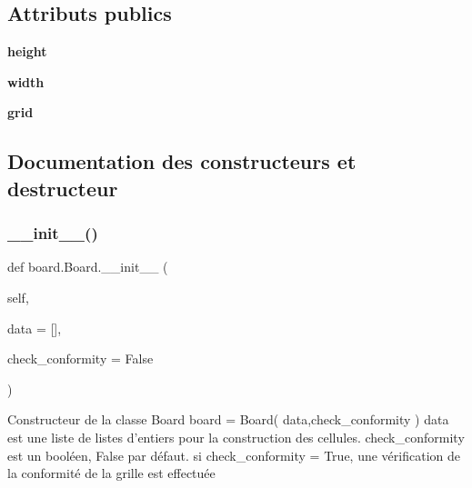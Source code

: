 \subsection*{Attributs publics}
\begin{DoxyCompactItemize}
\item 
\mbox{\label{classboard_1_1Board_ae1fef3be4abb2c765b81cad7042e6df9}} 
{\bfseries height}
\item 
\mbox{\label{classboard_1_1Board_a96e3212b056035d81c4081b01be6eada}} 
{\bfseries width}
\item 
\mbox{\label{classboard_1_1Board_ae57d2e7fd76a7700f92fcaa838e19dba}} 
{\bfseries grid}
\end{DoxyCompactItemize}


\subsection{Documentation des constructeurs et destructeur}
\mbox{\label{classboard_1_1Board_a85c5ad518a95fb8f9bdee5969cd28c7a}} 
\subsubsection{\texorpdfstring{\+\_\+\+\_\+init\+\_\+\+\_\+()}{\_\_init\_\_()}}
{\footnotesize\ttfamily def board.\+Board.\+\_\+\+\_\+init\+\_\+\+\_\+ (\begin{DoxyParamCaption}\item[{}]{self,  }\item[{}]{data = {\ttfamily \mbox{[}\mbox{]}},  }\item[{}]{check\+\_\+conformity = {\ttfamily False} }\end{DoxyParamCaption})}

\begin{DoxyVerb}Constructeur de la classe Board
    board = Board( data,check_conformity )
    data est une liste de listes d'entiers pour la construction des cellules.
    check_conformity est un booléen, False par défaut.
    si check_conformity = True, une vérification de la conformité de la grille est effectuée
\end{DoxyVerb}
 

